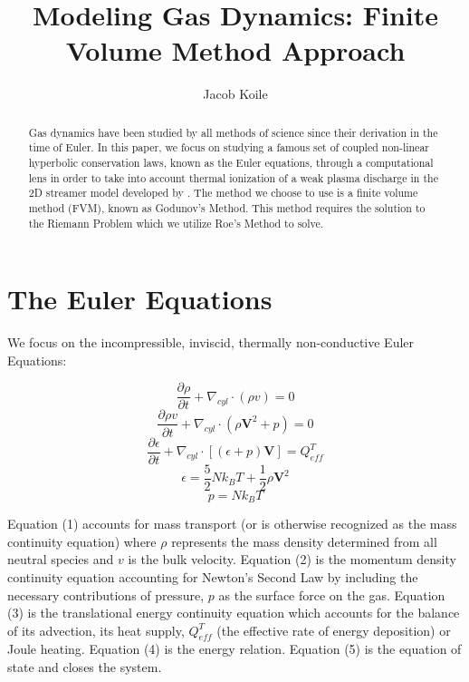 \documentclass[]{article}
\title{Modeling Gas Dynamics: Finite Volume Method Approach}
\author{Jacob Koile}
\begin{document}
\maketitle

\begin{abstract}
	Gas dynamics have been studied by all methods of science since their derivation in the time of Euler. In this paper, we focus on studying a famous set of coupled non-linear hyperbolic conservation laws, known as the Euler equations, through a computational lens in order to take into account thermal ionization of a weak plasma discharge in the 2D streamer model developed by \citet{Liu:2004b}. The method we choose to use is a finite volume method (FVM), known as Godunov's Method. This method requires the solution to the Riemann Problem which we utilize Roe's Method to solve.  

\end{abstract}

\section{The Euler Equations}

	We focus on the incompressible, inviscid, thermally non-conductive Euler Equations:

	\begin{equation}
	\frac{\partial\rho}{\partial t} + \nabla_{cyl} \cdot (\rho v) = 0
	\end{equation} 
	\begin{equation}
	\frac{\partial \rho v}{\partial t} + \nabla_{cyl} \cdot (\rho \textbf{V}^2 + p) = 0   
	\end{equation}
	\begin{equation}
	\frac{\partial \epsilon}{\partial t} + \nabla_{cyl} \cdot [(\epsilon + p)\textbf{V}] = Q_{eff}^T  
	\end{equation}	 
	\begin{equation}
	\epsilon = \frac{5}{2} N k_B T + \frac{1}{2}\rho \textbf{V}^2 
	\end{equation}
	\begin{equation}
	p = N k_B T
	\end{equation}

	Equation (1) accounts for mass transport (or is otherwise recognized as the mass continuity equation) where $\rho$ represents the mass density determined from all neutral species and $v$ is the bulk velocity. Equation (2) is the momentum density continuity equation accounting for Newton's Second Law by including the necessary contributions of pressure, $p$ as the surface force on the gas. Equation (3) is the translational energy continuity equation which accounts for the balance of its advection, its heat supply, $Q_{eff}^T$ (the effective rate of energy deposition) or Joule heating. Equation (4) is the energy relation. Equation (5) is the equation of state and closes the system.
	
\end{document}
